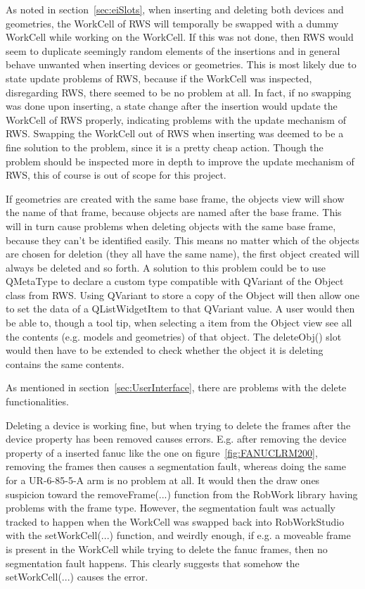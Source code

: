 As noted in section~\ref{sec:eiSlots}, when inserting and deleting both devices and geometries, the WorkCell of RWS will temporally be swapped with a dummy WorkCell while working on the WorkCell. If this was not done, then RWS would seem to duplicate seemingly random elements of the insertions and in general behave unwanted when inserting devices or geometries. This is most likely due to state update problems of RWS, because if the WorkCell was inspected, disregarding RWS, there seemed to be no problem at all. In fact, if no swapping was done upon inserting, a state change after the insertion would update the WorkCell of RWS properly, indicating problems with the update mechanism of RWS. Swapping the WorkCell out of RWS when inserting was deemed to be a fine solution to the problem, since it is a pretty cheap action. Though the problem should be inspected more in depth to improve the update mechanism of RWS, this of course is out of scope for this project. 

If geometries are created with the same base frame, the objects view will show the name of that frame, because objects are named after the base frame. This will in turn cause problems when deleting objects with the same base frame, because they can't be identified easily. This means no matter which of the objects are chosen for deletion (they all have the same name), the first object created will always be deleted and so forth. A solution to this problem could be to use QMetaType \cite{QMetaType} to declare a custom type compatible with QVariant \cite{QVariant} of the Object class from RWS. Using QVariant to store a copy of the Object will then allow one to set the data of a QListWidgetItem to that QVariant value. A user would then be able to, though a tool tip, when selecting a item from the Object view see all the contents (e.g. models and geometries) of that object. The deleteObj() slot would then have to be extended to check whether the object it is deleting contains the same contents.

As mentioned in section~\ref{sec:UserInterface}, there are problems with the delete functionalities. 

Deleting a device is working fine, but when trying to delete the frames after the device property has been removed causes errors. E.g. after removing the device property of a inserted fanuc like the one on figure~\ref{fig:FANUCLRM200}, removing the frames then causes a segmentation fault, whereas doing the same for a UR-6-85-5-A arm is no problem at all. It would then the draw ones suspicion toward the removeFrame(...) function from the RobWork library having problems with the frame type. However, the segmentation fault was actually tracked to happen when the WorkCell was swapped back into RobWorkStudio with the setWorkCell(...) function, and weirdly enough, if e.g. a moveable frame is present in the WorkCell while trying to delete the fanuc frames, then no segmentation fault happens. This clearly suggests that somehow the setWorkCell(...) causes the error.


